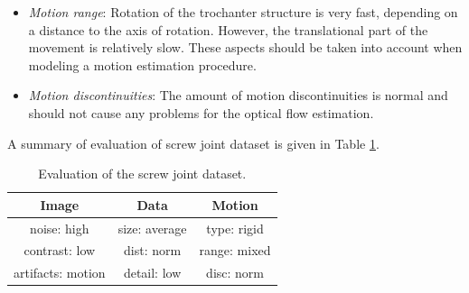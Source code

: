 \begin{itemize}
	\item \textit{Motion range}: Rotation of the trochanter structure is very fast, depending on a distance to the axis of rotation. However, the translational part of the movement is relatively slow. These aspects should be taken into account when modeling a motion estimation procedure.
	
	\item \textit{Motion discontinuities}: The amount of motion discontinuities is normal and should not cause any problems for the optical flow estimation.
\end{itemize}




A summary of evaluation of screw joint dataset is given in Table \ref{tab:eval_screw}.
\begin{table}[ht] \footnotesize
	\centering
	\caption{Evaluation of the screw joint dataset.}
	\begin{tabular}{ccc}
		\toprule
		\textbf{Image} & \textbf{Data}   & \textbf{Motion}   \\ 
		\midrule
		\cellcolor{bad} noise: high         & \cellcolor{norm} size:  average  & \cellcolor{good} type: rigid    \\ 
		\cellcolor{bad} contrast: low         & \cellcolor{norm} dist: norm            & \cellcolor{bad} range: mixed  \\ 
		\cellcolor{bad} artifacts: motion   & \cellcolor{bad} detail: low  &  \cellcolor{good} disc: norm   \\ 
		\bottomrule
	\end{tabular}
	\label{tab:eval_screw}%
\end{table}


